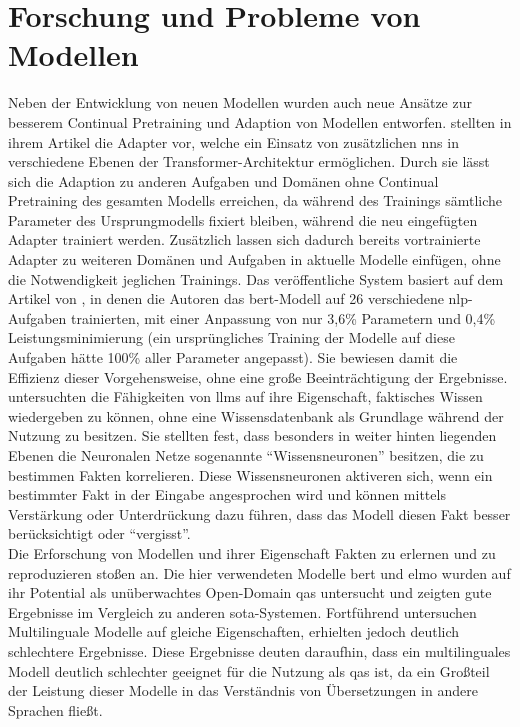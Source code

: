 \section{Forschung und Probleme von Modellen}
Neben der Entwicklung von neuen Modellen wurden auch neue Ansätze zur besserem Continual Pretraining und Adaption von Modellen entworfen. 
\citet{adapterhub} stellten in ihrem Artikel die Adapter vor, welche ein Einsatz von zusätzlichen \ac{nn}s in verschiedene Ebenen der Transformer-Architektur ermöglichen.
Durch sie lässt sich die Adaption zu anderen Aufgaben und Domänen ohne Continual Pretraining des gesamten Modells erreichen, da während des Trainings sämtliche Parameter des Ursprungmodells fixiert bleiben, während die neu eingefügten Adapter trainiert werden.
Zusätzlich lassen sich dadurch bereits vortrainierte Adapter zu weiteren Domänen und Aufgaben in aktuelle Modelle einfügen, ohne die Notwendigkeit jeglichen Trainings.
Das veröffentliche System basiert auf dem Artikel von \citet{adapter_build_on}, in denen die Autoren das \ac{bert}-Modell auf 26 verschiedene \ac{nlp}-Aufgaben trainierten, mit einer Anpassung von nur 3,6\% Parametern und 0,4\% Leistungsminimierung (ein ursprüngliches Training der Modelle auf diese Aufgaben hätte 100\% aller Parameter angepasst). Sie bewiesen damit die Effizienz dieser Vorgehensweise, ohne eine große Beeinträchtigung der Ergebnisse.\\

\citet{knowledge_neurons} untersuchten die Fähigkeiten von \ac{llm}s auf ihre Eigenschaft, faktisches Wissen wiedergeben zu können, ohne eine Wissensdatenbank als Grundlage während der Nutzung zu besitzen.
Sie stellten fest, dass besonders in weiter hinten liegenden Ebenen die Neuronalen Netze sogenannte \enquote{Wissensneuronen} besitzen, die zu bestimmen Fakten korrelieren.
Diese Wissensneuronen aktiveren sich, wenn ein bestimmter Fakt in der Eingabe angesprochen wird und können mittels Verstärkung oder Unterdrückung dazu führen, dass das Modell diesen Fakt besser berücksichtigt oder \enquote{vergisst}.\\

Die Erforschung von Modellen und ihrer Eigenschaft Fakten zu erlernen und zu reproduzieren stoßen \citet{knowledge_base} an. Die hier verwendeten Modelle \ac{bert} und \ac{elmo} wurden auf ihr Potential als unüberwachtes Open-Domain \ac{qas} untersucht und zeigten gute Ergebnisse im Vergleich zu anderen \ac{sota}-Systemen.
Fortführend untersuchen \citet{xfactr} Multilinguale Modelle auf gleiche Eigenschaften, erhielten jedoch deutlich schlechtere Ergebnisse. Diese Ergebnisse deuten daraufhin, dass ein multilinguales Modell deutlich schlechter geeignet für die Nutzung als \ac{qas} ist, da ein Großteil der Leistung dieser Modelle in das Verständnis von Übersetzungen in andere Sprachen fließt.\\

